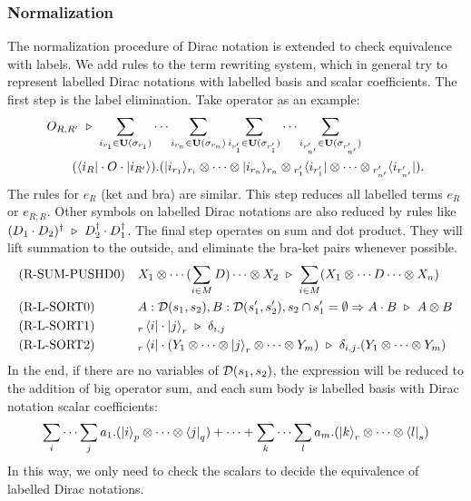 \subsubsection{Normalization}
The normalization procedure of Dirac notation is extended to check equivalence with labels.
We add rules to the term rewriting system, which in general try to represent labelled Dirac notations with labelled basis and scalar coefficients. The first step is the label elimination. Take operator as an example:
\begin{align*}
    & O_{R,R'} \ \triangleright\ \sum_{i_{r_1}\in\mathbf{U}(\sigma_{r_1})}\cdots \sum_{i_{r_n}\in\mathbf{U}(\sigma_{r_n})}
    \sum_{i_{r'_1}\in\mathbf{U}(\sigma_{r'_1})}\cdots \sum_{i_{r'_{n'}}\in\mathbf{U}(\sigma_{r'_{n'}})} \\
    & \qquad (\langle i_R|\cdot O\cdot |i_{R'}\rangle).(|i_{r_1}\rangle_{r_i}\otimes\cdots\otimes|i_{r_n}\rangle_{r_n} \otimes {}_{r'_1}\langle i_{r'_1}|\otimes\cdots\otimes{}_{r'_{n'}}\langle i_{r'_{n'}}|).
\end{align*}
The rules for $e_R$ (ket and bra) are similar. This step reduces all labelled terms $e_R$ or $e_{R;R}$.
Other symbols on labelled Dirac notations are also reduced by rules like $(D_1 \cdot D_2)^\dagger \ \triangleright\ D_2^\dagger \cdot D_1^\dagger$.
The final step operates on sum and dot product. They will lift summation to the outside, and eliminate the bra-ket pairs whenever possible.
\begin{align*}
    & \textrm{(R-SUM-PUSHD0)}
    && X_1 \otimes \cdots (\sum_{i \in M} D) \cdots \otimes X_2\ \triangleright\ \sum_{i \in M} (X_1 \otimes \cdots D \cdots \otimes X_n) \\
    & \textrm{(R-L-SORT0)}
    && A : \mathcal{D}(s_1, s_2), B : \mathcal{D}(s_1', s_2'), s_2 \cap s_1'=\emptyset \Rightarrow A \cdot B \ \triangleright\ A \otimes B \\
    & \textrm{(R-L-SORT1)}
    && {}_r\bra{i}\cdot\ket{j}_r \ \triangleright\ \delta_{i, j} \\
    & \textrm{(R-L-SORT2)}
    && {}_r\bra{i}\cdot(Y_1 \otimes \cdots \otimes \ket{j}_r \otimes \cdots \otimes Y_m) \ \triangleright\ \delta_{i, j}.(Y_1  \otimes \cdots \otimes Y_m)
\end{align*}
In the end, if there are no variables of $\mathcal{D}(s_1, s_2)$, the expression will be reduced to the addition of big operator sum, and each sum body is labelled basis with Dirac notation scalar coefficients:
\[
    \sum_{i}\cdots\sum_{j} a_1 . (\ket{i}_{p} \otimes \cdots \otimes \bra{j}_{q})
    + \cdots +
    \sum_{k}\cdots\sum_{l} a_m . (\ket{k}_{r} \otimes \cdots \otimes \bra{l}_{s})
\]
In this way, we only need to check the scalars to decide the equivalence of labelled Dirac notations.

